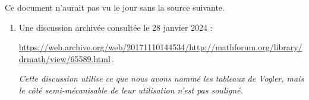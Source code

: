 Ce document n'aurait pas vu le jour sans la source suivante.

\begin{enumerate}
	\item Une discussion archivée consultée le 28 janvier 2024 : 
	
	\noindent
	\url{https://web.archive.org/web/20171110144534/http://mathforum.org/library/drmath/view/65589.html}\,.
	
	\smallskip
	\noindent
	\emph{Cette discussion utilise ce que nous avons nommé les tableaux de Vogler, mais le côté semi-mécanisable de leur utilisation n'est pas souligné.}
\end{enumerate}
